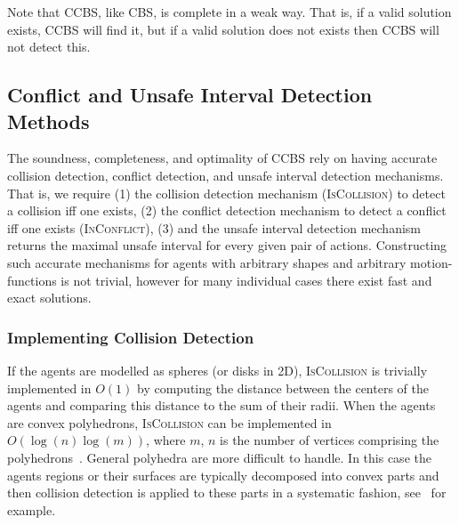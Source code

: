 \documentclass[review]{elsarticle}
\newcommand{\ccbs}{\ac{CCBS}\xspace}
\newcommand{\cbs}{\ac{CBS}\xspace}
\newcommand{\iscollision}{\textsc{IsCollision}\xspace}
\newcommand{\inconflict}{\textsc{InConflict}\xspace}
\begin{document}
Note that \ccbs, like \cbs, is complete in a weak way. That is, if a valid solution exists, \ccbs will find it, but if a valid solution does not exists then \ccbs will not detect this. 




\subsection{Conflict and Unsafe Interval Detection Methods}
\label{sec:conflict-and-unsafe-detection}


The soundness, completeness, and optimality of \ccbs rely on having accurate collision detection, conflict detection, and unsafe interval detection mechanisms. That is, we require (1) the collision detection mechanism (\iscollision) to detect a collision iff one exists, (2) the conflict detection mechanism to detect a conflict iff one exists (\inconflict), (3) and the unsafe interval detection mechanism returns the maximal unsafe interval for every given pair of actions. 
Constructing such accurate mechanisms for agents with arbitrary shapes and arbitrary motion-functions is not trivial, however for many individual cases there exist fast and exact solutions.

\subsubsection{Implementing Collision Detection}
If the agents are modelled as spheres (or disks in 2D), \iscollision is trivially implemented in $O(1)$ by computing the distance between the centers of the agents and comparing this distance to the sum of their radii. When the agents are convex polyhedrons, \iscollision can be implemented in $O(\log(n) \log(m))$, where $m$, $n$ is the number of vertices comprising the polyhedrons~\cite{dobkin1990determining}. General polyhedra are more difficult to handle. In this case the agents regions or their surfaces are typically decomposed into convex parts and then collision detection is applied to these parts in a systematic fashion, see~\cite{gottschalk1996obbtree} for example.
\end{document}
